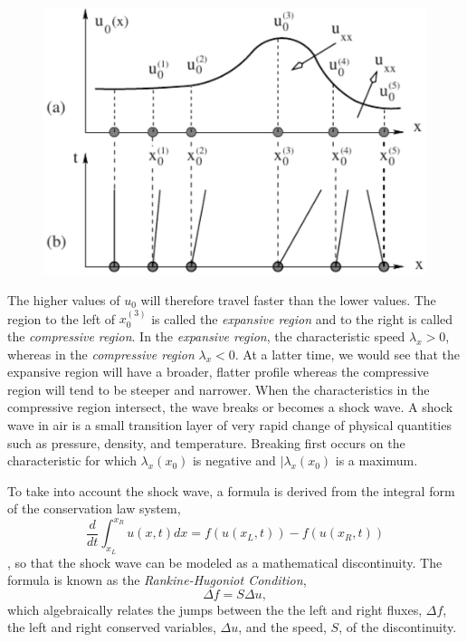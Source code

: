 \documentclass[]{article}
\begin{document}
			\begin{figure}[h] 	
				\centering
				\includegraphics[scale=.50]{WaveDistortion}
				\caption{}
				\label{WaveDistortion}
			\end{figure}
			The higher values of $ u_0$ will therefore travel faster than the lower values. The region to the left of $ x_0^(3) $ is called the \textit{expansive region} and to the right is called the \textit{compressive region}. In the \textit{expansive region}, the characteristic speed $ \lambda_x > 0$, whereas in the \textit{compressive region} $ \lambda_x < 0 $. At a latter time, we would see that the expansive region will have a broader, flatter profile whereas the compressive region will tend to be steeper and narrower. When the characteristics in the compressive region intersect, the wave breaks or becomes a shock wave. A shock wave in air is a small transition layer of very rapid change of physical quantities such as pressure, density, and temperature. Breaking first occurs on the characteristic for which $ \lambda_x(x_0) $ is negative and $ |\lambda_x(x_0) $ is a maximum.
	
			To take into account the shock wave, a formula is derived from the integral form of the conservation law system,
			\begin{equation}
				\frac{d}{dt}\int_{x_L}^{x_R}u(x,t)dx = f(u(x_L, t)) - f(u(x_R,t))
			\end{equation}, so that the shock wave can be modeled as a mathematical discontinuity. The formula is known as the \textit{Rankine-Hugoniot Condition},
			\begin{equation}
				\Delta f = S \Delta u,
			\end{equation}
			which algebraically relates the jumps between the the left and right fluxes, $ \Delta f $, the left and right conserved variables, $ \Delta u $, and the speed, $ S $, of the discontinuity.
	
\end{document}
